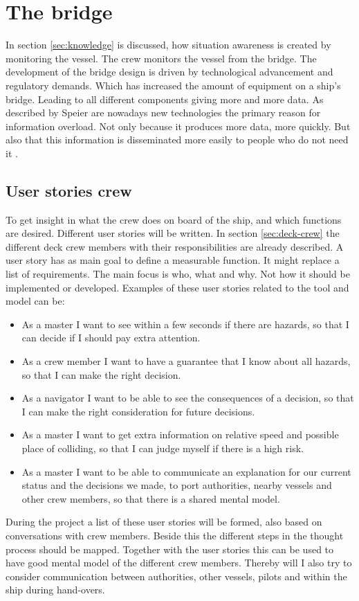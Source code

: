 \chapter{The bridge}
In section \ref{sec:knowledge} is discussed, how situation awareness is created by monitoring the vessel. The crew monitors the vessel from the bridge. The development of the bridge design is driven by technological advancement and regulatory demands. Which has increased the amount of equipment on a ship's bridge. Leading to all different components giving more and more data. As described by Speier are nowadays new technologies the primary reason for information overload. Not only because it produces more data, more quickly. But also that this information is disseminated more easily to people who do not need it \cite{Speier1999}. 

\section{User stories crew}
To get insight in what the crew does on board of the ship, and which functions are desired. Different user stories will be written. In section \ref{sec:deck-crew} the different deck crew members with their responsibilities are already described. 
A user story has as main goal to define a measurable function. It might replace a list of requirements. The main focus is who, what and why. Not how it should be implemented or developed. Examples of these user stories related to the tool and model can be:
\begin{itemize}
	\item As a master I want to see within a few seconds if there are hazards, so that I can decide if I should pay extra attention.
	\item As a crew member I want to have a guarantee that I know about all hazards, so that I can make the right decision.
	\item As a navigator I want to be able to see the consequences of a decision, so that I can make the right consideration for future decisions.
	\item As a master I want to get extra information on relative speed and possible place of colliding, so that I can judge myself if there is a high risk.
	\item As a master I want to be able to communicate an explanation for our current status and the decisions we made, to port authorities, nearby vessels and other crew members, so that there is a shared mental model.
\end{itemize}
During the project a list of these user stories will be formed, also based on conversations with crew members. Beside this the different steps in the thought process should be mapped. Together with the user stories this can be used to have good mental model of the different crew members. 
Thereby will I also try to consider communication between authorities, other vessels, pilots and within the ship during hand-overs. 

